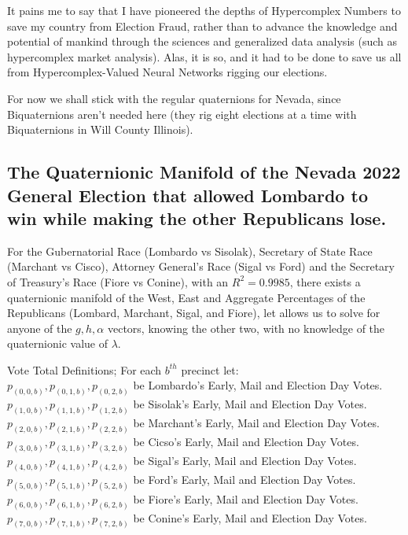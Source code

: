 \documentclass[preprint,13pt]{elsarticle}
\begin{document}
It pains me to say that I have pioneered the depths of Hypercomplex Numbers to save my country from Election Fraud, rather than to advance the knowledge and potential of mankind through the sciences and generalized data analysis (such as hypercomplex market analysis). Alas, it is so, and it had to be done to save us all from Hypercomplex-Valued Neural Networks rigging our elections.

For now we shall stick with the regular quaternions for Nevada, since Biquaternions aren't needed here (they rig eight elections at a time with Biquaternions in Will County Illinois).
\newpage
\subsection{The Quaternionic Manifold of the Nevada 2022 General Election that allowed Lombardo to win while making the other Republicans lose.}

For the Gubernatorial Race (Lombardo vs Sisolak), Secretary of State Race (Marchant vs Cisco), Attorney General's Race (Sigal vs Ford) and the Secretary of Treasury's Race (Fiore vs Conine), with an $R^2=0.9985$, there exists a quaternionic manifold of the West, East and Aggregate Percentages of the Republicans (Lombard, Marchant, Sigal, and Fiore), let allows us to solve for anyone of the $g,h,\alpha$ vectors, knowing the other two, with no knowledge of the quaternionic value of $\lambda$.

Vote Total Definitions; For each $b^{th}$ precinct let:\\
$p_{(0,0,b)}, p_{(0,1,b)}, p_{(0,2,b)}$ be Lombardo's Early, Mail and Election Day Votes.\\
$p_{(1,0,b)}, p_{(1,1,b)}, p_{(1,2,b)}$ be Sisolak's Early, Mail and Election Day Votes.\\
$p_{(2,0,b)}, p_{(2,1,b)}, p_{(2,2,b)}$ be Marchant's Early, Mail and Election Day Votes.\\
$p_{(3,0,b)}, p_{(3,1,b)}, p_{(3,2,b)}$ be Cicso's Early, Mail and Election Day Votes.\\
$p_{(4,0,b)}, p_{(4,1,b)}, p_{(4,2,b)}$ be Sigal's Early, Mail and Election Day Votes.\\
$p_{(5,0,b)}, p_{(5,1,b)}, p_{(5,2,b)}$ be Ford's Early, Mail and Election Day Votes.\\
$p_{(6,0,b)}, p_{(6,1,b)}, p_{(6,2,b)}$ be Fiore's Early, Mail and Election Day Votes.\\
$p_{(7,0,b)}, p_{(7,1,b)}, p_{(7,2,b)}$ be Conine's Early, Mail and Election Day Votes.\\
\end{document}
